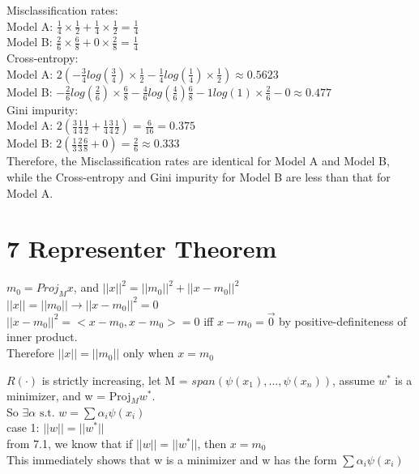 \documentclass{article}
\newenvironment{sub}[2][$-$]{\begin{trivlist}
		\item[\hskip \labelsep {\bfseries #1}\hskip \labelsep {\bfseries #2.}]}  {\end{trivlist}}
\begin{document}
Misclassification rates:\\
Model A: $\frac{1}{4} \times \frac{1}{2} +\frac{1}{4} \times \frac{1}{2} = \frac{1}{4}$\\
Model B: $\frac{2}{6} \times \frac{6}{8} +0 \times \frac{2}{8} = \frac{1}{4}$\\

Cross-entropy: \\
Model A: $2(-\frac{3}{4}log(\frac{3}{4})\times \frac{1}{2}  - \frac{1}{4}log(\frac{1}{4})\times \frac{1}{2}) \approx 0.5623 $\\
Model B: $-\frac{2}{6}log(\frac{2}{6})\times \frac{6}{8}  - \frac{4}{6}log(\frac{4}{6}) \frac{6}{8}- 1log(1)\times \frac{2}{6} - 0 \approx 0.477 $\\

Gini impurity:\\
Model A: $2(\frac{3}{4}\frac{1}{4}\frac{1}{2} + \frac{1}{4}\frac{3}{4}\frac{1}{2} )=  \frac{6}{16} = 0.375$\\
Model B: $2(\frac{1}{3}\frac{2}{3}\frac{6}{8} + 0) =  \frac{2}{6} \approx 0.333$\\

Therefore, the Misclassification rates are identical for Model A and Model B, while the Cross-entropy and Gini impurity for Model B are less than that for Model A.

\section{7 Representer Theorem}
\begin{sub}{7.1}
\end{sub}
$m_0 = Proj_Mx$, and $||x||^2 = ||m_0||^2 + ||x - m_0||^2$\\
$||x|| = ||m_0|| \rightarrow ||x - m_0||^2 = 0$\\
$||x - m_0||^2 = <x - m_0,x - m_0>= 0$ iff $x-m_0 =\vec{0}$ by positive-definiteness of inner product. \\
Therefore $||x|| = ||m_0||$ only when $x=m_0 $

\begin{sub}{7.2}
\end{sub}
$R(\cdot)$ is strictly increasing, let M = $span(\psi(x_1),...,\psi(x_n) )$, assume $w^*$ is a minimizer, and w = Proj$_Mw^*$.\\ So $\exists \alpha \text{ s.t. } w = \sum\alpha_i\psi(x_i)  $\\

case 1: $||w|| = ||w^*||$\\
from 7.1, we know that if  $||w|| = ||w^*||$, then $x = m_0$\\
This immediately shows that w is a minimizer and w has the form $\sum\alpha_i\psi(x_i)  $\\
\end{document}

